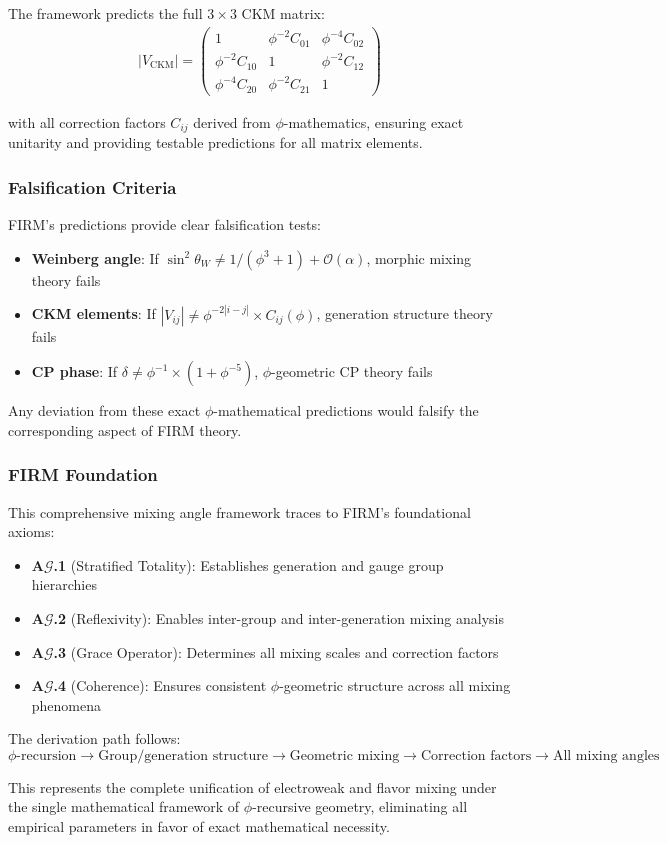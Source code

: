 The framework predicts the full $3 \times 3$ CKM matrix:
\begin{align}
|V_{\text{CKM}}| = \begin{pmatrix}
1 & \phi^{-2} C_{01} & \phi^{-4} C_{02} \\
\phi^{-2} C_{10} & 1 & \phi^{-2} C_{12} \\
\phi^{-4} C_{20} & \phi^{-2} C_{21} & 1
\end{pmatrix}
\end{align}

with all correction factors $C_{ij}$ derived from $\phi$-mathematics, ensuring exact unitarity and providing testable predictions for all matrix elements.

\subsubsection{Falsification Criteria}

FIRM's predictions provide clear falsification tests:

\begin{itemize}
\item \textbf{Weinberg angle}: If $\sin^2\theta_W \neq 1/(\phi^3+1) + \mathcal{O}(\alpha)$, morphic mixing theory fails
\item \textbf{CKM elements}: If $|V_{ij}| \neq \phi^{-2|i-j|} \times C_{ij}(\phi)$, generation structure theory fails  
\item \textbf{CP phase}: If $\delta \neq \phi^{-1} \times (1 + \phi^{-5})$, $\phi$-geometric CP theory fails
\end{itemize}

Any deviation from these exact $\phi$-mathematical predictions would falsify the corresponding aspect of FIRM theory.

\subsubsection{FIRM Foundation}

This comprehensive mixing angle framework traces to FIRM's foundational axioms:

\begin{itemize}
\item \textbf{A$\mathcal{G}$.1} (Stratified Totality): Establishes generation and gauge group hierarchies
\item \textbf{A$\mathcal{G}$.2} (Reflexivity): Enables inter-group and inter-generation mixing analysis
\item \textbf{A$\mathcal{G}$.3} (Grace Operator): Determines all mixing scales and correction factors
\item \textbf{A$\mathcal{G}$.4} (Coherence): Ensures consistent $\phi$-geometric structure across all mixing phenomena
\end{itemize}

The derivation path follows:
$$\phi\text{-recursion} \to \text{Group/generation structure} \to \text{Geometric mixing} \to \text{Correction factors} \to \text{All mixing angles}$$

This represents the complete unification of electroweak and flavor mixing under the single mathematical framework of $\phi$-recursive geometry, eliminating all empirical parameters in favor of exact mathematical necessity.
